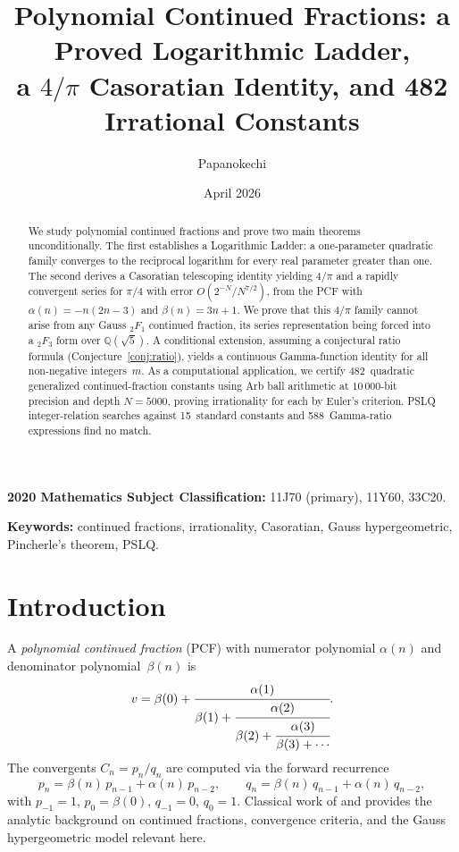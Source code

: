 \documentclass[11pt,a4paper]{article}
\title{Polynomial Continued Fractions: a Proved Logarithmic Ladder,\\
a \texorpdfstring{$4/\pi$}{4/pi} Casoratian Identity, and 482 Irrational Constants}
\author{Papanokechi}
\date{April 2026}
\theoremstyle{plain}
\theoremstyle{definition}
\theoremstyle{remark}
\begin{document}
\maketitle

\begin{abstract}
We study polynomial continued fractions and prove two main theorems
unconditionally.
The first establishes a Logarithmic Ladder: a one-parameter quadratic
family converges to the reciprocal logarithm for every real parameter
greater than one.
The second derives a Casoratian telescoping identity yielding $4/\pi$
and a rapidly convergent series for $\pi/4$ with error
$O(2^{-N}/N^{7/2})$, from the PCF with $\alpha(n) = -n(2n{-}3)$
and $\beta(n) = 3n{+}1$.
We prove that this $4/\pi$ family cannot arise from any Gauss
${}_2F_1$ continued fraction, its series representation being forced
into a ${}_2F_3$ form over $\mathbb{Q}(\sqrt{5})$.
A conditional extension, assuming a conjectural ratio formula
(Conjecture~\ref{conj:ratio}), yields a continuous Gamma-function
identity for all non-negative integers~$m$.
As a computational application, we certify 482~quadratic generalized
continued-fraction constants using Arb ball arithmetic at
$10\,000$-bit precision and depth $N = 5000$, proving irrationality
for each by Euler's criterion.
PSLQ integer-relation searches against 15~standard constants and
588~Gamma-ratio expressions find no match.
\end{abstract}

\noindent
\textbf{2020 Mathematics Subject Classification:}
11J70 (primary), 11Y60, 33C20.

\noindent
\textbf{Keywords:}
continued fractions, irrationality, Casoratian,
Gauss hypergeometric, Pincherle's theorem, PSLQ.

\tableofcontents

\section{Introduction}\label{sec:intro}


A \emph{polynomial continued fraction} (PCF) with numerator polynomial
$\alpha(n)$ and denominator polynomial~$\beta(n)$ is
\begin{equation}\label{eq:pcf}
  v = \beta(0) + \cfrac{\alpha(1)}{\beta(1) +
  \cfrac{\alpha(2)}{\beta(2) + \cfrac{\alpha(3)}{\beta(3) + \cdots}}}.
\end{equation}
The convergents $C_n = p_n/q_n$ are computed via the forward recurrence
\begin{equation}\label{eq:rec}
  p_n = \beta(n)\,p_{n-1} + \alpha(n)\,p_{n-2}, \qquad
  q_n = \beta(n)\,q_{n-1} + \alpha(n)\,q_{n-2},
\end{equation}
with $p_{-1} = 1$, $p_0 = \beta(0)$, $q_{-1} = 0$, $q_0 = 1$.
Classical work of \citet{wall1948} and \citet{lorentzen2008}
provides the analytic background on continued fractions, convergence criteria,
and the Gauss hypergeometric model relevant here.
\end{document}
